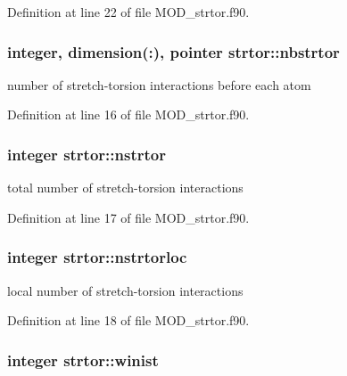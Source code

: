 Definition at line 22 of file M\-O\-D\-\_\-strtor.\-f90.

\hypertarget{classstrtor_ad92798bea203d341d2c7fdf4f53d729d}{
\subsubsection[{nbstrtor}]{\setlength{\rightskip}{0pt plus 5cm}integer, dimension(\-:), pointer strtor\-::nbstrtor}}\label{classstrtor_ad92798bea203d341d2c7fdf4f53d729d}


number of stretch-\/torsion interactions before each atom 



Definition at line 16 of file M\-O\-D\-\_\-strtor.\-f90.

\hypertarget{classstrtor_a971cdce99050711499c0f32a110c42b8}{
\subsubsection[{nstrtor}]{\setlength{\rightskip}{0pt plus 5cm}integer strtor\-::nstrtor}}\label{classstrtor_a971cdce99050711499c0f32a110c42b8}


total number of stretch-\/torsion interactions 



Definition at line 17 of file M\-O\-D\-\_\-strtor.\-f90.

\hypertarget{classstrtor_a66396ecb7c8062d13dce1e65367dec2f}{
\subsubsection[{nstrtorloc}]{\setlength{\rightskip}{0pt plus 5cm}integer strtor\-::nstrtorloc}}\label{classstrtor_a66396ecb7c8062d13dce1e65367dec2f}


local number of stretch-\/torsion interactions 



Definition at line 18 of file M\-O\-D\-\_\-strtor.\-f90.

\hypertarget{classstrtor_aa10171ea7624c58c069bd729d8ea202a}{
\subsubsection[{winist}]{\setlength{\rightskip}{0pt plus 5cm}integer strtor\-::winist}}\label{classstrtor_aa10171ea7624c58c069bd729d8ea202a}


